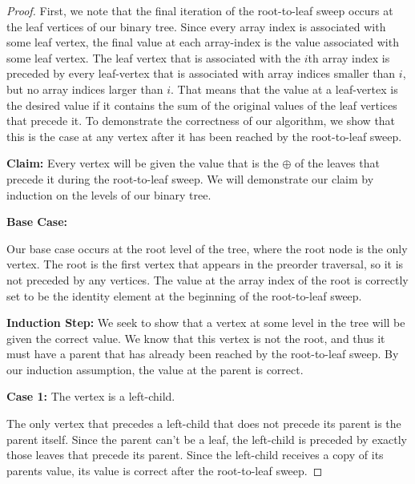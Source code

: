 \documentclass[12pt,twoside]{reedthesis}
\begin{document}
\setlength{\parindent}{0cm}
\begin{proof}
First, we note that the final iteration of the root-to-leaf sweep occurs at the leaf vertices of our binary tree. Since every array index is associated with some leaf vertex, the final value at each array-index is the value associated with some leaf vertex. The leaf vertex that is associated with the $i$th array index is preceded by every leaf-vertex that is associated with array indices smaller than $i$, but no array indices larger than $i$. That means that the value at a leaf-vertex is the desired value if it contains the sum of the original values of the leaf vertices that precede it. To demonstrate the correctness of our algorithm, we show that this is the case at any vertex after it has been reached by the root-to-leaf sweep.

\vspace{1pc}

\textbf{Claim:} Every vertex will be given the value that is the $\oplus$ of the leaves that precede it during the root-to-leaf sweep.
\vspace{.5pc}
We will demonstrate our claim by induction on the levels of our binary tree.
\vspace{.5pc}

\textbf{Base Case:} 

Our base case occurs at the root level of the tree, where the root node is the only vertex. The root is the first vertex that appears in the preorder traversal, so it is not preceded by any vertices. The value at the array index of the root is correctly set to be the identity element at the beginning of the root-to-leaf sweep.
\vspace{.5pc}

\textbf{Induction Step:}
We seek to show that a vertex at some level in the tree will be given the correct value. We know that this vertex is not the root, and thus it must have a parent that has already been reached by the root-to-leaf sweep. By our induction assumption, the value at the parent is correct.

\vspace{.5pc}
\textbf{Case 1:} The vertex is a left-child.

The only vertex that precedes a left-child that does not precede its parent is the parent itself. Since the parent can't be a leaf, the left-child is preceded by exactly those leaves that precede its parent. Since the left-child receives a copy of its parents value, its value is correct after the root-to-leaf sweep.


\end{proof}
\end{document}
